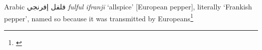 \begin{etymology}\label{ety:fulful_ifranji}
Arabic {فلفل إفرنجي} \textit{fulful ifranjī} `allspice' [European pepper], literally `Frankish pepper', named so because it was transmitted by Europeans\footnote{\textcite{baalbaki_-mawrid_1995}}
\end{etymology}